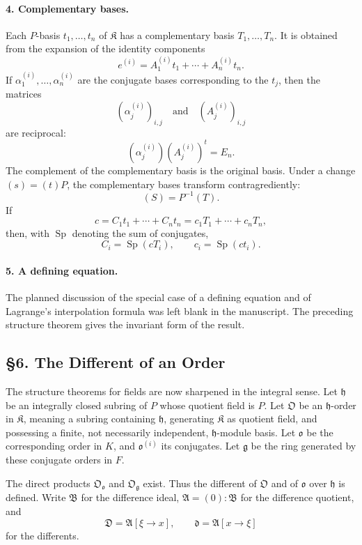 \documentclass[11pt]{article}
\begin{document}
\paragraph{4. Complementary bases.}
Each $P$-basis $t_1,\ldots,t_n$ of $\mathfrak K$ has a complementary basis $T_1,\ldots,T_n$. It is obtained from the expansion of the identity components
\[
        e^{(i)}=A_1^{(i)}t_1+
        \cdots+A_n^{(i)}t_n.
\]
If $\alpha_1^{(i)},\ldots,\alpha_n^{(i)}$ are the conjugate bases corresponding to the $t_j$, then the matrices
\[
        (\alpha_j^{(i)})_{i,j}
        \quad\text{and}\quad
        (A_j^{(i)})_{i,j}
\]
are reciprocal:
\[
        (\alpha_j^{(i)})(A_j^{(i)})^{t}=E_n.
\]
The complement of the complementary basis is the original basis. Under a change $(s)=(t)P$, the complementary bases transform contragrediently:
\[
        (S)=P^{-1}(T).
\]
If
\[
        c=C_1t_1+
        \cdots+C_nt_n
        =c_1T_1+
        \cdots+c_nT_n,
\]
then, with $\operatorname{Sp}$ denoting the sum of conjugates,
\[
        C_i=\operatorname{Sp}(cT_i),
        \qquad
        c_i=\operatorname{Sp}(ct_i).
\]

\paragraph{5. A defining equation.}
The planned discussion of the special case of a defining equation and of Lagrange's interpolation formula was left blank in the manuscript. The preceding structure theorem gives the invariant form of the result.

\subsection*{§6. The Different of an Order}

The structure theorems for fields are now sharpened in the integral sense. Let $\mathfrak h$ be an integrally closed subring of $P$ whose quotient field is $P$. Let $\mathfrak O$ be an $\mathfrak h$-order in $\mathfrak K$, meaning a subring containing $\mathfrak h$, generating $\mathfrak K$ as quotient field, and possessing a finite, not necessarily independent, $\mathfrak h$-module basis. Let $\mathfrak o$ be the corresponding order in $K$, and $\mathfrak o^{(i)}$ its conjugates. Let $\mathfrak g$ be the ring generated by these conjugate orders in $F$.

The direct products $\mathfrak O_{\mathfrak o}$ and $\mathfrak O_{\mathfrak g}$ exist. Thus the different of $\mathfrak O$ and of $\mathfrak o$ over $\mathfrak h$ is defined. Write $\mathfrak B$ for the difference ideal, $\mathfrak A=(0):\mathfrak B$ for the difference quotient, and
\[
        \mathfrak D=\mathfrak A[\xi\to x],
        \qquad
        \mathfrak d=\mathfrak A[x\to\xi]
\]
for the differents.
\end{document}
